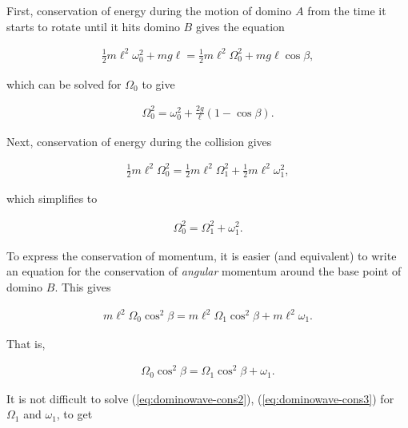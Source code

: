 \documentclass[11pt]{report}
\theoremstyle{plain}
\theoremstyle{definition}
\begin{document}
First, conservation of energy during the motion of
domino $A$ from the time it starts to rotate until it
hits domino $B$ gives the equation

\begin{align*}
\tfrac12 m \ell^2 \omega_0^2 + mg\ell = \tfrac12 m \ell^2 \Omega_0^2 + mg\ell \cos \beta,
\end{align*}

which can be solved for $\Omega_0$ to give

\begin{equation*} \tag{25}\label{eq:dominowave-cons1}
\begin{split}
\Omega_0^2 = \omega_0^2 + \frac{2g}{\ell}(1-\cos \beta).
\end{split}
\end{equation*}

Next, conservation of energy during the collision
gives

\begin{align*}
\tfrac12 m\ell^2 \Omega_0^2 = \tfrac12 m\ell^2 \Omega_1^2 + \tfrac12m\ell^2 \omega_1^2,
\end{align*}

which simplifies to

\begin{equation*} \tag{26}\label{eq:dominowave-cons2}
\begin{split}
\Omega_0^2 = \Omega_1^2 + \omega_1^2.
\end{split}
\end{equation*}

To express the conservation of momentum, it is easier
(and equivalent) to write an equation for the
conservation of \emph{angular} momentum around the base
point of domino $B$. This gives

\begin{align*}
m\ell^2\Omega_0 \cos^2\beta = m\ell^2\Omega_1 \cos^2 \beta + m\ell^2\omega_1.
\end{align*}

That is,

\begin{equation*} \tag{27}\label{eq:dominowave-cons3}
\begin{split}
\Omega_0\cos^2\beta = \Omega_1\cos^2\beta + \omega_1.
\end{split}
\end{equation*}

It is not difficult to solve (\ref{eq:dominowave-cons2}),
(\ref{eq:dominowave-cons3}) for $\Omega_1$ and $\omega_1$,
to get
\end{document}
